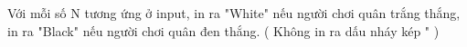 Với mỗi số N tương ứng ở input, in ra "White" nếu người chơi quân trắng thắng, in ra "Black" nếu người chơi quân đen thắng. ( Không in ra dấu nháy kép " )

\